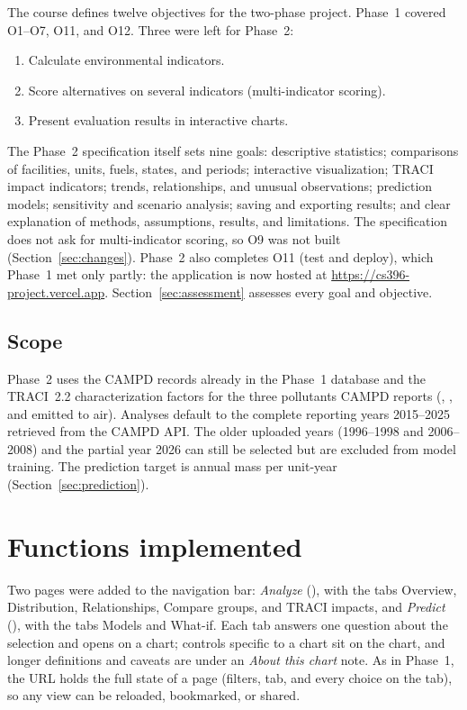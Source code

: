 \documentclass[11pt,a4paper]{article}
\begin{document}
The course defines twelve objectives for the two-phase project. Phase~1 covered O1--O7, O11,
and O12. Three were left for Phase~2:
\begin{enumerate}[label=O\arabic*., start=8]
  \item Calculate environmental indicators.
  \item Score alternatives on several indicators (multi-indicator scoring).
  \item Present evaluation results in interactive charts.
\end{enumerate}
The Phase~2 specification itself sets nine goals: descriptive statistics; comparisons of
facilities, units, fuels, states, and periods; interactive visualization; TRACI impact
indicators; trends, relationships, and unusual observations; prediction models; sensitivity and
scenario analysis; saving and exporting results; and clear explanation of methods, assumptions,
results, and limitations. The specification does not ask for multi-indicator scoring, so O9 was
not built (Section~\ref{sec:changes}). Phase~2 also completes O11 (test and deploy), which
Phase~1 met only partly: the application is now hosted at
\url{https://cs396-project.vercel.app}. Section~\ref{sec:assessment} assesses every goal and
objective.

\subsection{Scope}

Phase~2 uses the CAMPD records already in the Phase~1 database and the TRACI~2.2
characterization factors for the three pollutants CAMPD reports (\COtwo{}, \SOtwo{}, and \NOx{}
emitted to air). Analyses default to the complete reporting years 2015--2025 retrieved from the
CAMPD API. The older uploaded years (1996--1998 and 2006--2008) and the partial year 2026 can
still be selected but are excluded from model training. The prediction target is annual \NOx{}
mass per unit-year (Section~\ref{sec:prediction}).

\section{Functions implemented}
\label{sec:functions}

Two pages were added to the navigation bar: \emph{Analyze} (), with the tabs
Overview, Distribution, Relationships, Compare groups, and TRACI impacts, and \emph{Predict}
(), with the tabs Models and What-if. Each tab answers one question about the
selection and opens on a chart; controls specific to a chart sit on the chart, and longer
definitions and caveats are under an \emph{About this chart} note. As in Phase~1, the URL holds
the full state of a page (filters, tab, and every choice on the tab), so any view can be
reloaded, bookmarked, or shared.
\end{document}
